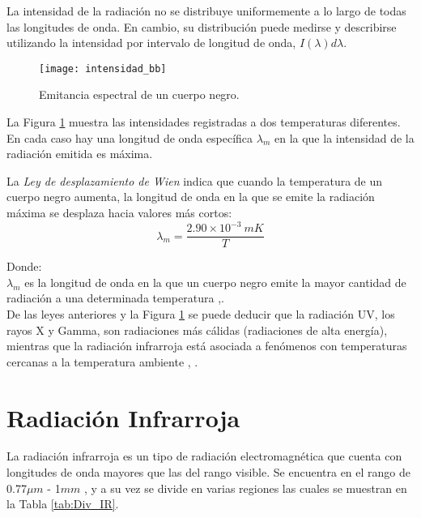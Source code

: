     La intensidad de la radiación no se distribuye uniformemente a lo largo de todas las longitudes de onda. En cambio, su distribución puede medirse y describirse utilizando la intensidad por intervalo de longitud de onda, $I(\lambda)d\lambda$.
            \begin{figure}[hbtp]
                \centering
                \texttt{[image: intensidad\_bb]}
                \caption{Emitancia espectral de un cuerpo negro.}
                \label{fig:intensidad_bb}
            \end{figure}    
    \newpage
    La Figura \ref{fig:intensidad_bb} muestra las intensidades registradas a dos temperaturas diferentes. En cada caso hay una longitud de onda específica $\lambda_{m}$ en la que la intensidad de la radiación emitida es máxima.
    
    La \textit{Ley de desplazamiento de Wien} indica que cuando la temperatura de un cuerpo negro aumenta, la longitud de onda en la que se emite la radiación máxima se desplaza hacia valores más cortos:\\
    \begin{equation}
        \lambda_{m} = \frac{2.90\times10^{-3}\ mK}{T}
        \label{eq:Wien}
    \end{equation}  
    
    Donde:\\
    $\lambda_{m}$ es la longitud de onda en la que un cuerpo negro emite la mayor cantidad de radiación a una determinada temperatura \cite{Sears},\cite{FUV3}.\\
    
    De las leyes anteriores y la Figura \ref{fig:intensidad_bb} se puede deducir que la radiación UV, los rayos X y Gamma, son radiaciones más cálidas (radiaciones de alta energía), mientras que la radiación infrarroja está asociada a fenómenos con temperaturas cercanas a la temperatura ambiente \cite{Chang}, \cite{BlancoMDA}.     
    
    \section{Radiación Infrarroja} 
    La radiación infrarroja es un tipo de radiación electromagnética que cuenta con longitudes de onda mayores que las del rango visible. Se encuentra en el rango de 0.77$\mu m$ - 1$mm$ \cite{BlancoMDA}, y a su vez se divide en varias regiones las cuales se muestran en la Tabla \ref{tab:Div_IR}.
    
